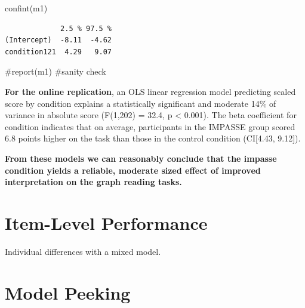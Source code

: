 \documentclass[
  letterpaper,
  DIV=11,
  numbers=noendperiod]{scrreprt}
\newenvironment{Shaded}{\begin{snugshade}}{\end{snugshade}}
\newcommand{\CommentTok}[1]{\textcolor[rgb]{0.37,0.37,0.37}{#1}}
\newcommand{\FunctionTok}[1]{\textcolor[rgb]{0.28,0.35,0.67}{#1}}
\newcommand{\NormalTok}[1]{\textcolor[rgb]{0.00,0.23,0.31}{#1}}
\begin{document}
\begin{Shaded}
\begin{Highlighting}[]
\FunctionTok{confint}\NormalTok{(m1)}
\end{Highlighting}
\end{Shaded}

\begin{verbatim}
             2.5 % 97.5 %
(Intercept)  -8.11  -4.62
condition121  4.29   9.07
\end{verbatim}

\begin{Shaded}
\begin{Highlighting}[]
\CommentTok{\#report(m1) \#sanity check}
\end{Highlighting}
\end{Shaded}

\textbf{For the online replication}, an OLS linear regression model
predicting scaled score by condition explains a statistically
significant and moderate 14\% of variance in absolute score (F(1,202) =
32.4, p \textless{} 0.001). The beta coefficient for condition indicates
that on average, participants in the IMPASSE group scored 6.8 points
higher on the task than those in the control condition (CI{[}4.43,
9.12{]}).

\begin{tcolorbox}[enhanced jigsaw, toptitle=1mm, toprule=.15mm, bottomtitle=1mm, leftrule=.75mm, title=\textcolor{quarto-callout-note-color}{\faInfo}\hspace{0.5em}{Note}, opacityback=0, titlerule=0mm, opacitybacktitle=0.6, colframe=quarto-callout-note-color-frame, rightrule=.15mm, breakable, bottomrule=.15mm, colbacktitle=quarto-callout-note-color!10!white, coltitle=black, arc=.35mm, colback=white, left=2mm]
\textbf{From these models we can reasonably conclude that the impasse
condition yields a reliable, moderate sized effect of improved
interpretation on the graph reading tasks.}
\end{tcolorbox}

\hypertarget{item-level-performance}{%
\section{Item-Level Performance}\label{item-level-performance}}

Individual differences with a mixed model.

\hypertarget{model-peeking}{%
\section{Model Peeking}\label{model-peeking}}
\end{document}
